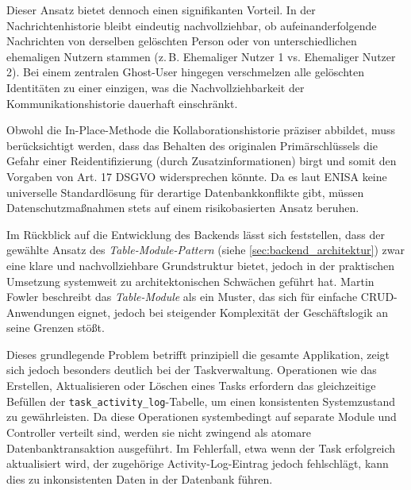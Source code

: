 Dieser Ansatz bietet dennoch einen signifikanten Vorteil. In der Nachrichtenhistorie bleibt eindeutig nachvollziehbar, ob aufeinanderfolgende Nachrichten von derselben gelöschten Person oder von unterschiedlichen ehemaligen Nutzern stammen (z.\,B. \glqq{}Ehemaliger Nutzer 1\grqq{} vs. \glqq{}Ehemaliger Nutzer 2\grqq{}). Bei einem zentralen Ghost-User hingegen verschmelzen alle gelöschten Identitäten zu einer einzigen, was die Nachvollziehbarkeit der Kommunikationshistorie dauerhaft einschränkt.

Obwohl die In-Place-Methode die Kollaborationshistorie präziser abbildet, muss berücksichtigt werden, dass das Behalten des originalen Primärschlüssels die Gefahr einer Reidentifizierung (durch Zusatzinformationen) birgt und somit den Vorgaben von Art. 17 DSGVO widersprechen könnte. Da es laut \gls{ENISA} keine universelle Standardlösung für derartige Datenbankkonflikte gibt, müssen Datenschutzmaßnahmen stets auf einem risikobasierten Ansatz beruhen\cite[S.~42]{enisa2019pseudonymisation}.

\label{sec:table_modul_pattern_vs_domain_model}
Im Rückblick auf die Entwicklung des Backends lässt sich feststellen, dass der gewählte Ansatz des \textit{Table-Module-Pattern} (siehe \autoref{sec:backend_architektur}) zwar eine klare und nachvollziehbare Grundstruktur bietet, jedoch in der praktischen Umsetzung systemweit zu architektonischen Schwächen geführt hat. Martin Fowler beschreibt das \textit{Table-Module} als ein Muster, das sich für einfache \gls{CRUD}-Anwendungen eignet, jedoch bei steigender Komplexität der Geschäftslogik an seine Grenzen stößt\cite[S.~125--131]{fowler2002patterns}.

Dieses grundlegende Problem betrifft prinzipiell die gesamte Applikation, zeigt sich jedoch besonders deutlich bei der Taskverwaltung. Operationen wie das Erstellen, Aktualisieren oder Löschen eines Tasks erfordern das gleichzeitige Befüllen der \texttt{task\_activity\_log}-Tabelle, um einen konsistenten Systemzustand zu gewährleisten. Da diese Operationen systembedingt auf separate Module und Controller verteilt sind, werden sie nicht zwingend als atomare Datenbanktransaktion ausgeführt. Im Fehlerfall, etwa wenn der Task erfolgreich aktualisiert wird, der zugehörige Activity-Log-Eintrag jedoch fehlschlägt, kann dies zu inkonsistenten Daten in der Datenbank führen.

